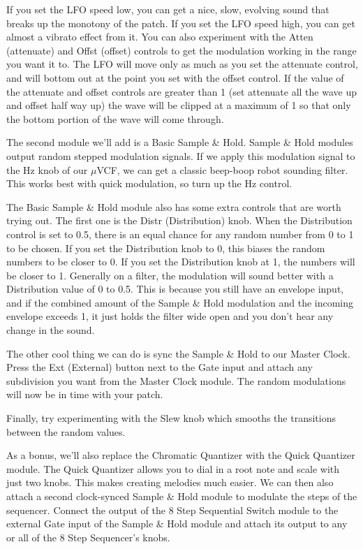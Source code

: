 \documentclass[11pt]{book}
\begin{document}
If you set the LFO speed low, you can get a nice, slow, evolving sound that breaks up the monotony of the patch. If you set the LFO speed high, you can get almost a vibrato effect from it. You can also experiment with the Atten (attenuate) and Offst (offset) controls to get the modulation working in the range you want it to. The LFO will move only as much as you set the attenuate control, and will bottom out at the point you set with the offset control. If the value of the attenuate and offset controls are greater than 1 (set attenuate all the wave up and offset half way up) the wave will be clipped at a maximum of 1 so that only the bottom portion of the wave will come through.

The second module we'll add is a Basic Sample \& Hold. Sample \& Hold modules output random stepped modulation signals. If we apply this modulation signal to the Hz knob of our $\mu$VCF, we can get a classic beep-boop robot sounding filter. This works best with quick modulation, so turn up the Hz control.

The Basic Sample \& Hold module also has some extra controls that are worth trying out. The first one is the Distr (Distribution) knob. When the Distribution control is set to 0.5, there is an equal chance for any random number from 0 to 1 to be chosen. If you set the Distribution knob to 0, this biases the random numbers to be closer to 0. If you set the Distribution knob at 1, the numbers will be closer to 1. Generally on a filter, the modulation will sound better with a Distribution value of 0 to 0.5. This is because you still have an envelope input, and if the combined amount of the Sample \& Hold modulation and the incoming envelope exceeds 1, it just holds the filter wide open and you don't hear any change in the sound.

The other cool thing we can do is sync the Sample \& Hold to our Master Clock. Press the Ext (External) button next to the Gate input and attach any subdivision you want from the Master Clock module. The random modulations will now be in time with your patch.

Finally, try experimenting with the Slew knob which smooths the transitions between the random values. 

As a bonus, we'll also replace the Chromatic Quantizer with the Quick Quantizer module. The Quick Quantizer allows you to dial in a root note and scale with just two knobs. This makes creating melodies much easier. We can then also attach a second clock-synced Sample \& Hold module to modulate the steps of the sequencer. Connect the output of the 8 Step Sequential Switch module to the external Gate input of the Sample \& Hold module and attach its output to any or all of the 8 Step Sequencer's knobs.
\end{document}
